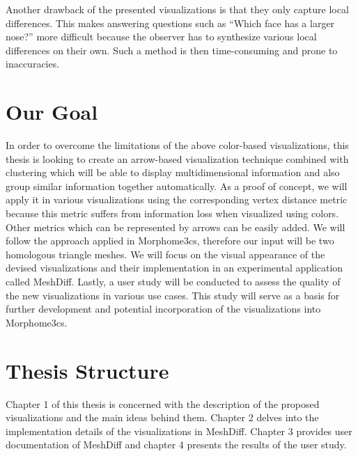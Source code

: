 Another drawback of the presented visualizations is that they only capture local differences. This makes answering questions such as ``Which face has a larger nose?'' more difficult because the observer has to synthesize various local differences on their own. Such a method is then time-consuming and prone to inaccuracies.
\section*{Our Goal}

In order to overcome the limitations of the above color-based visualizations, this thesis is looking to create an arrow-based visualization technique combined with clustering which will be able to display multidimensional information and also group similar information together automatically. As a proof of concept, we will apply it in various visualizations using the corresponding vertex distance metric because this metric suffers from information loss when visualized using colors. Other metrics which can be represented by arrows can be easily added. We will follow the approach applied in Morphome3cs, therefore our input will be two homologous triangle meshes. We will focus on the visual appearance of the devised visualizations and their implementation in an experimental application called MeshDiff. Lastly, a user study will be conducted to assess the quality of the new visualizations in various use cases. This study will serve as a basis for further development and potential incorporation of the visualizations into Morphome3cs.
\section*{Thesis Structure}

Chapter 1 of this thesis is concerned with the description of the proposed visualizations and the main ideas behind them. Chapter 2 delves into the implementation details of the visualizations in MeshDiff. Chapter 3 provides user documentation of MeshDiff and chapter 4 presents the results of the user study.